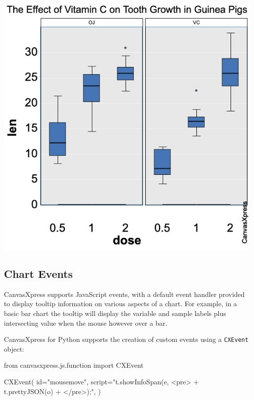\documentclass[
  letterpaper,
  DIV=11,
  numbers=noendperiod]{scrartcl}
\newenvironment{Shaded}{\begin{snugshade}}{\end{snugshade}}
\newcommand{\BuiltInTok}[1]{\textcolor[rgb]{0.00,0.23,0.31}{#1}}
\newcommand{\ImportTok}[1]{\textcolor[rgb]{0.00,0.46,0.62}{#1}}
\newcommand{\NormalTok}[1]{\textcolor[rgb]{0.00,0.23,0.31}{#1}}
\newcommand{\OperatorTok}[1]{\textcolor[rgb]{0.37,0.37,0.37}{#1}}
\newcommand{\StringTok}[1]{\textcolor[rgb]{0.13,0.47,0.30}{#1}}
\begin{document}
\includegraphics{boxplot_grouped_by_dosage.png}

\hypertarget{chart-events}{%
\subsection{Chart Events}\label{chart-events}}

CanvasXpress supports JavaScript events, with a default event handler
provided to display tooltip information on various aspects of a chart.
For example, in a basic bar chart the tooltip will display the variable
and sample labels plus intersecting value when the mouse however over a
bar.

CanvasXpress for Python supports the creation of custom events using a
\texttt{CXEvent} object:

\begin{Shaded}
\begin{Highlighting}[]
\ImportTok{from}\NormalTok{ canvasxpress.js.function }\ImportTok{import}\NormalTok{ CXEvent}

\NormalTok{CXEvent(}
    \BuiltInTok{id}\OperatorTok{=}\StringTok{"mousemove"}\NormalTok{,}
\NormalTok{    script}\OperatorTok{=}\StringTok{"t.showInfoSpan(e, \textquotesingle{}\textless{}pre\textgreater{}\textquotesingle{} + t.prettyJSON(o) + \textquotesingle{}\textless{}/pre\textgreater{}\textquotesingle{});"}\NormalTok{,}
\NormalTok{)}
\end{Highlighting}
\end{Shaded}
\end{document}
